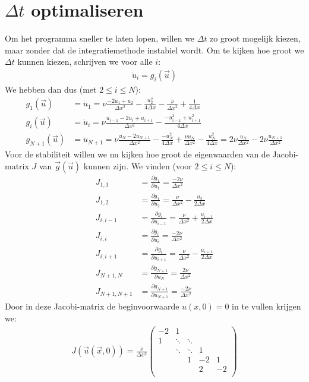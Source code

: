 \documentclass{article}
\newcommand{\Dt}{\Delta t}
\begin{document}
\newpage
\section*{$\Dt$ optimaliseren}
Om het programma sneller te laten lopen, willen we $\Dt
$ zo groot mogelijk kiezen, maar zonder dat de integratiemethode instabiel wordt.
Om te kijken hoe groot we $\Dt$ kunnen kiezen, schrijven we voor alle $i$:
\begin{align*}
\dot{u}_i =g_i(\vec{u})
\end{align*}
We hebben dan dus (met $2\leq i \leq N$):
\begin{align*}
g_1(\vec{u})&=\dot{u}_1 = \nu \frac{-2u_1+u_2}{\Delta x^2} -\frac{u_2^2}{4\Delta x} -\frac{\nu}{\Delta x^2} +\frac{1}{4\Delta x}\\
g_i(\vec{u})&=\dot{u}_i = \nu \frac{u_{i-1}-2u_i+u_{i+1}}{\Delta x^2} -\frac{-u_{i-1}^2+u_{i+1}^2}{4\Delta x}\\
g_{N+1}(\vec{u})&=\dot{u}_{N+1} = \nu \frac{u_{N}-2u_{N+1}}{\Delta x^2} -\frac{-u_N^2}{4\Delta x} +\frac{\nu u_N}{\Delta x^2} -\frac{u_N^2}{4\Delta x}
=2\nu \frac{u_N}{\Delta x^2} -2\nu\frac{u_{N+1}}{\Delta x^2}
\end{align*}
Voor de stabiliteit willen we nu kijken hoe groot de eigenwaarden van de Jacobi-matrix $J$ van $\vec{g}(\vec{u})$ kunnen zijn.
We vinden (voor $2\leq i\leq N$):
\begin{align*}
J_{1,1} &= \frac{\partial g_1}{\partial u_1} = \frac{-2\nu}{\Delta x^2}\\
J_{1,2} &= \frac{\partial g_1}{\partial u_2} = \frac{\nu}{\Delta x^2} -\frac{u_2}{2\Delta x}\\
J_{i,i-1} &= \frac{\partial g_i}{\partial u_{i-1}} = \frac{\nu}{\Delta x^2}+\frac{u_{i-1}}{2\Delta x}\\
J_{i,i} &= \frac{\partial g_i}{\partial u_i} = \frac{-2\nu}{\Delta x^2}\\
J_{i,i+1} &= \frac{\partial g_i}{\partial u_{i+1}} = \frac{\nu}{\Delta x^2} -\frac{u_{i+1}}{2\Delta x}\\
J_{N+1,N} &= \frac{\partial g_{N+1}}{\partial u_N} =  \frac{2\nu}{\Delta x^2}\\
J_{N+1,N+1} &= \frac{\partial g_{N+1}}{\partial u_{N+1}} = \frac{-2\nu}{\Delta x^2}
\end{align*}
Door in deze Jacobi-matrix de beginvoorwaarde $u(x,0) =0$ in te vullen krijgen we:
\begin{align*}
J(\vec{u}(\vec{x},0)) = \frac{\nu}{\Delta x^2}
\begin{pmatrix}
-2 & 1 & &&\\
1 &\ddots &\ddots&&\\
&\ddots &\ddots&1&\\
& &1&-2&1\\
& &&2&-2\\
\end{pmatrix}
\end{align*}
\end{document}
